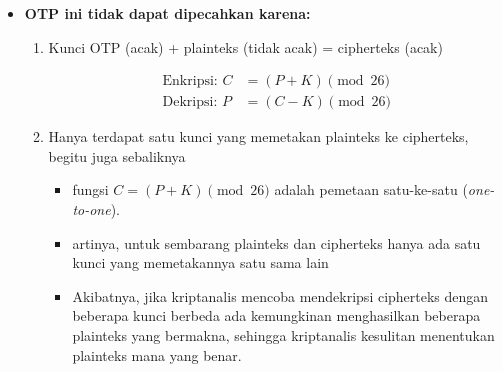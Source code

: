 \documentclass{article}
\begin{document}

\begin{itemize}
    \item[$\bullet$] \textbf{OTP ini tidak dapat dipecahkan karena:}
    \begin{enumerate}
        \item Kunci OTP (acak) + plainteks (tidak acak) = cipherteks (acak)
        
        \begin{align*}
            \text{Enkripsi: } C &= (P + K) \pmod{26} \\ 
            \text{Dekripsi: } P &= (C - K) \pmod{26}
        \end{align*}
        
        \item Hanya terdapat satu kunci yang memetakan plainteks ke cipherteks, begitu juga sebaliknya
        \begin{itemize}
            \item[$\rightarrow$] fungsi $C = (P + K) \pmod{26}$ adalah pemetaan satu-ke-satu (\textit{one-to-one}).
            \item[$\rightarrow$] artinya, untuk sembarang plainteks dan cipherteks hanya ada satu kunci yang memetakannya satu sama lain
            \item[$\rightarrow$] Akibatnya, jika kriptanalis mencoba mendekripsi cipherteks dengan beberapa kunci berbeda ada kemungkinan menghasilkan beberapa plainteks yang bermakna, sehingga kriptanalis kesulitan menentukan plainteks mana yang benar.
        \end{itemize}
    \end{enumerate}
\end{itemize}
\end{document}
